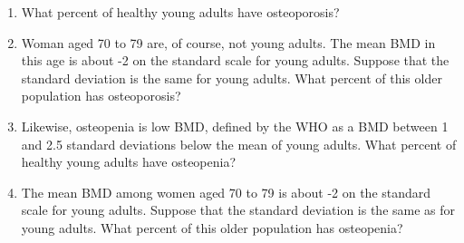 \documentclass[letterpaper,12pt,twoside,]{pinp}
\providecommand{\tightlist}{%
  \setlength{\itemsep}{0pt}\setlength{\parskip}{0pt}}
\begin{document}
\begin{enumerate}
\def\labelenumi{\alph{enumi}.}
\tightlist
\item
  What percent of healthy young adults have osteoporosis?
\item
  Woman aged 70 to 79 are, of course, not young adults. The mean BMD in
  this age is about -2 on the standard scale for young adults. Suppose
  that the standard deviation is the same for young adults. What percent
  of this older population has osteoporosis?
\item
  Likewise, osteopenia is low BMD, defined by the WHO as a BMD between 1
  and 2.5 standard deviations below the mean of young adults. What
  percent of healthy young adults have osteopenia?
\item
  The mean BMD among women aged 70 to 79 is about -2 on the standard
  scale for young adults. Suppose that the standard deviation is the
  same as for young adults. What percent of this older population has
  osteopenia?
\end{enumerate}





\end{document}
